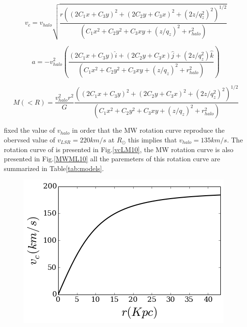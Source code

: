 \begin{equation}
v_c = v_{halo} \sqrt{ \dfrac{r((2C_1x + C_3 y)^2 + (2C_2y + C_3x)^2 + (2z/q_z^2)^2)^{1/2}}{(C_1 x^2 + C_2 y^2 + C_3 x y + (z/q_z)^2 + r_{halo}^2)} }
\end{equation}


\begin{equation}
a = - v_{halo}^2  \left( \dfrac{(2C_1x + C_3 y)\hat{i} + (2C_2y + C_3x)\hat{j} + (2z/q_z^2)\hat{k}}{(C_1 x^2 + C_2 y^2 + C_3 x y + (z/q_z)^2 + r_{halo}^2)} \right)
\end{equation}

\begin{equation}
M(<R) = \dfrac{v_{halo}^2 r^2}{G} \dfrac{((2C_1x + C_3 y)^2 + (2C_2y + C_3x)^2 + (2z/q_z^2)^2)^{1/2}}{(C_1 x^2 + C_2 y^2 + C_3 x y + (z/q_z)^2 + r_{halo}^2)}   
\end{equation}

\citep{Law10} fixed the value of $v_{halo}$ in order that the MW rotation curve reproduce the obervsed value of $v_{LSR}= 220 km/s$ at $R_{\odot}$
this implies that $v_{halo} = 135 km/s$. The rotation curve of is presented in Fig.\ref{vcLM10}, the MW rotation curve is also presented in
Fig.\ref{MWML10} all the paremeters of this rotation curve are summarized in Table\ref{tab:models}.

\begin{figure}[H]
\centering
\includegraphics[scale=0.7]{../figures/vcLM10.png}
\label{fig:vcLM10}
\end{figure}

